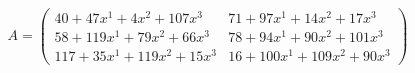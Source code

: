 \documentclass[preview]{standalone}
\begin{document}
\begin{align*}
A = \begin{pmatrix}40 + 47x^{1} + 4x^{2} + 107x^{3} & 71 + 97x^{1} + 14x^{2} + 17x^{3} \\ 58 + 119x^{1} + 79x^{2} + 66x^{3} & 78 + 94x^{1} + 90x^{2} + 101x^{3} \\ 117 + 35x^{1} + 119x^{2} + 15x^{3} & 16 + 100x^{1} + 109x^{2} + 90x^{3}\end{pmatrix}
\end{align*}
\end{document}
